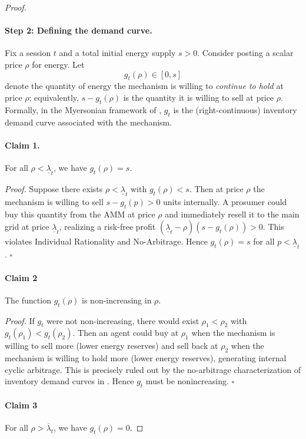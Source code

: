 \documentclass[12pt, notitlepage]{article}
\begin{document}
\begin{proof}
\paragraph{Step 2: Defining the demand curve.}
Fix a session \(t\) and a total initial energy supply  \(s>0\). Consider posting a scalar price \(\rho\) for energy. Let
\[
g_t(\rho)\in[0,s]
\]
denote the quantity of energy the mechanism is willing to \emph{continue to hold} at price \(\rho\); equivalently, \(s-g_t(\rho)\) is the quantity it is willing to sell at price \(\rho\). Formally, in the Myersonian framework of \citet{milionis2023myersonian},  \(g_t\) is the (right-continuous) inventory demand curve associated with the mechanism.

\paragraph{Claim 1.}
For all \(\rho<\underline{\lambda}_t\), we have \(g_t(\rho)=s\).

\emph{Proof.}
Suppose there exists \(\rho<\underline{\lambda}_t\) with \(g_t(\rho)<s\). Then at price \(\rho\) the mechanism is willing to sell \(s-g_t(p)>0\) units internally. A prosumer could buy this quantity from the AMM at price \(\rho\) and immediately resell it to the main grid at price \(\underline{\lambda}_t\), realizing a risk-free profit \((\underline{\lambda}_t-\rho)(s-g_t(\rho))>0\). This violates Individual Rationality and No-Arbitrage. Hence \(g_t(\rho)=s\) for all \(p<\underline{\lambda}_t\). \(\square\)

\paragraph{Claim 2}
The function \(g_t(\rho)\) is non-increasing in \(\rho\).

\emph{Proof.}
If \(g_t\) were not non-increasing, there would exist \(\rho_1<\rho_2\) with \(g_t(\rho_1)<g_t(\rho_2)\). Then an agent could buy at \(\rho_1\) when the mechanism is willing to sell more (lower energy reserves) and sell back at \(\rho_2\) when the mechanism is willing to hold more (lower energy reserves), generating internal cyclic arbitrage. This is precisely ruled out by the no-arbitrage characterization of inventory demand curves in \citet[Prop.~2.1]{milionis2023myersonian}. Hence \(g_t\) must be nonincreasing. \(\square\)

\paragraph{Claim 3}
For all \(\rho >\overline{\lambda}_t\), we have \(g_t(\rho)=0\).


\end{proof}
\end{document}
